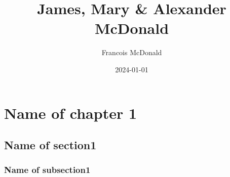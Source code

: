 \documentclass[12pt,a4paper]{memoir}
\title{James, Mary \& Alexander McDonald}
\author{Francois McDonald}
\date{2024-01-01}
\begin{document}
\maketitle
\tableofcontents*

\chapter{Name of chapter 1}
\section{Name of section1}
\subsection{Name of subsection1}
\end{document}
